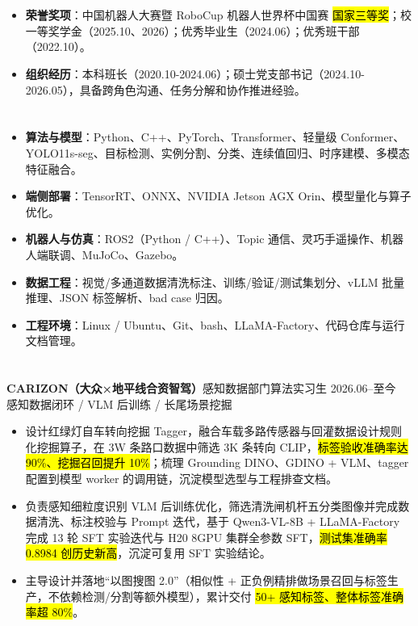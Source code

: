 \section[荣誉与组织经历]{}
\begin{itemize}
    \item {\textbf{荣誉奖项}}：中国机器人大赛暨 RoboCup 机器人世界杯中国赛 \hl{国家三等奖}；校一等奖学金（2025.10、2026）；优秀毕业生（2024.06）；优秀班干部（2022.10）。
    \item {\textbf{组织经历}}：本科班长（2020.10-2024.06）；硕士党支部书记（2024.10-2026.05），具备跨角色沟通、任务分解和协作推进经验。
\end{itemize}

\section[专业技能]{}
\begin{itemize}
    \item \textbf{算法与模型}：Python、C++、PyTorch、Transformer、轻量级 Conformer、YOLO11s-seg、目标检测、实例分割、分类、连续值回归、时序建模、多模态特征融合。
    \item \textbf{端侧部署}：TensorRT、ONNX、NVIDIA Jetson AGX Orin、模型量化与算子优化。
    \item \textbf{机器人与仿真}：ROS2（Python / C++）、Topic 通信、灵巧手遥操作、机器人端联调、MuJoCo、Gazebo。
    \item \textbf{数据工程}：视觉/多通道数据清洗标注、训练/验证/测试集划分、vLLM 批量推理、JSON 标签解析、bad case 归因。
    \item \textbf{工程环境}：Linux / Ubuntu、Git、bash、LLaMA-Factory、代码仓库与运行文档管理。
\end{itemize}


\vspace{0.04em}
\section[实习经历]{}
{\small\textbf{CARIZON（大众×地平线合资智驾）}}\quad 感知数据部门算法实习生 \hfill {2026.06--至今} \\
{\scriptsize\color{WHU_Blue} 感知数据闭环 / VLM 后训练 / 长尾场景挖掘}
\begin{itemize}
    \item 设计红绿灯自车转向挖掘 Tagger，融合车载多路传感器与回灌数据设计规则化挖掘算子，在 3W 条路口数据中筛选 3K 条转向 CLIP，\hl{标签验收准确率达 90\%、挖掘召回提升 10\%}；梳理 Grounding DINO、GDINO + VLM、tagger 配置到模型 worker 的调用链，沉淀模型选型与工程排查文档。
    \item 负责感知细粒度识别 VLM 后训练优化，筛选清洗闸机杆五分类图像并完成数据清洗、标注校验与 Prompt 迭代，基于 Qwen3-VL-8B + LLaMA-Factory 完成 13 轮 SFT 实验迭代与 H20 8GPU 集群全参数 SFT，\hl{测试集准确率 0.8984 创历史新高}，沉淀可复用 SFT 实验结论。
    \item 主导设计并落地“以图搜图 2.0”（相似性 + 正负例精排做场景召回与标签生产，不依赖检测/分割等额外模型），累计交付 \hl{50+ 感知标签、整体标签准确率超 80\%}。
\end{itemize}

